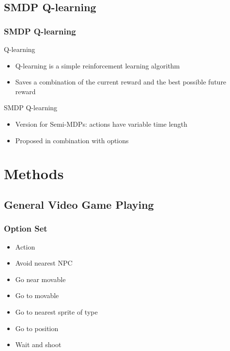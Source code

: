 \documentclass{beamer}
\begin{document}
\subsection{SMDP Q-learning}
\begin{frame}
	\frametitle{SMDP Q-learning \cite{sutton1999between}}
	\begin{block}{Q-learning}
		\begin{itemize}
			\item Q-learning is a simple reinforcement learning algorithm
			\item Saves a combination of the current reward and the best
				possible future reward
		\end{itemize}
	\end{block}
	\begin{block}{SMDP Q-learning}
		\begin{itemize}
			\item Version for Semi-MDPs: actions have variable time length
			\item Proposed in combination with options
		\end{itemize}
	\end{block}
\end{frame}

\section{Methods}
\subsection[GVGP]{General Video Game Playing}
\begin{frame}
	\frametitle{Option Set}
	\begin{itemize}
		\item Action
		\item Avoid nearest NPC
		\item Go near movable
		\item Go to movable
		\item Go to nearest sprite of type
		\item Go to position
		\item Wait and shoot
	\end{itemize}
\end{frame}
\end{document}
